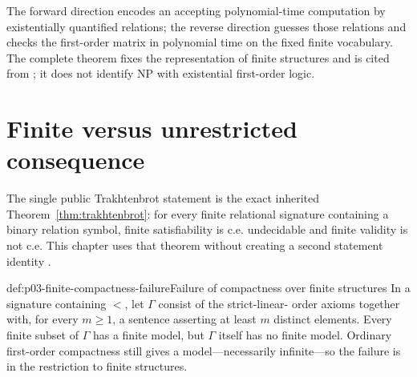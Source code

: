 The forward direction encodes an accepting polynomial-time computation by
existentially quantified relations; the reverse direction guesses those
relations and checks the first-order matrix in polynomial time on the fixed
finite vocabulary.  The complete theorem fixes the representation of finite
structures and is cited from \cite{Fagin1974,Libkin2004}; it does not identify
NP with existential first-order logic.

\section{Finite versus unrestricted consequence}
\label{sec:p03-finite-unrestricted}

The single public Trakhtenbrot statement is the exact inherited
Theorem~\ref{thm:trakhtenbrot}: for every finite relational signature
containing a binary relation symbol, finite satisfiability is c.e. undecidable
and finite validity is not c.e.  This chapter uses that theorem without
creating a second statement identity \cite{Trakhtenbrot1950}.

\begin{hbexample}{def:p03-finite-compactness-failure}{Failure of compactness over finite structures}
In a signature containing \(<\), let \(\Gamma\) consist of the strict-linear-
order axioms together with, for every \(m\geq1\), a sentence asserting at least
\(m\) distinct elements.  Every finite subset of \(\Gamma\) has a finite
model, but \(\Gamma\) itself has no finite model.  Ordinary first-order
compactness still gives a model---necessarily infinite---so the failure is in
the restriction to finite structures.
\end{hbexample}

